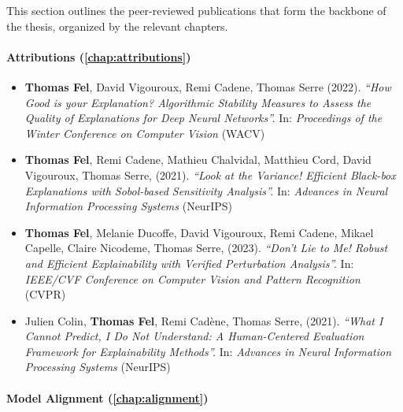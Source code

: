 This section outlines the peer-reviewed publications that form the backbone of the thesis, organized by the relevant chapters.

\paragraph{Attributions (\autoref{chap:attributions})}

\begin{itemize}
    \item \textbf{Thomas Fel}, David Vigouroux, Remi Cadene, Thomas Serre (2022). \textit{``How Good is your Explanation? Algorithmic Stability Measures to Assess the Quality of Explanations for Deep Neural Networks''.} In: \textit{Proceedings of the Winter Conference on Computer Vision} (\textcolor{confcolor}{WACV})

    \item \textbf{Thomas Fel}\equal, Remi Cadene\equal, Mathieu Chalvidal, Matthieu Cord, David Vigouroux, Thomas Serre, (2021). \textit{``Look at the Variance! Efficient Black-box Explanations with Sobol-based Sensitivity Analysis''.} In: \textit{Advances in Neural Information Processing Systems}  (\textcolor{confcolor}{NeurIPS})

    \item \textbf{Thomas Fel}\equal, Melanie Ducoffe\equal, David Vigouroux\equal, Remi Cadene, Mikael Capelle, Claire Nicodeme, Thomas Serre, (2023). \textit{``Don't Lie to Me! Robust and Efficient Explainability with Verified Perturbation Analysis''.} In: \textit{IEEE/CVF Conference on Computer Vision and Pattern Recognition}  (\textcolor{confcolor}{CVPR})

    \item Julien Colin\equal, \textbf{Thomas Fel}\equal, Remi Cadène, Thomas Serre, (2021). \textit{``What I Cannot Predict, I Do Not Understand: A Human-Centered Evaluation Framework for Explainability Methods''.} In: \textit{Advances in Neural Information Processing Systems} (\textcolor{confcolor}{NeurIPS})

\end{itemize}

\paragraph{Model Alignment (\autoref{chap:alignment})}


